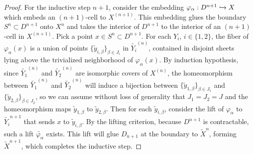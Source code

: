 \documentclass{article}
\begin{document}
\begin{enumerate}
\begin{enumerate}
\begin{proof}
        For the inductive step $n+1$, consider the embedding
        $\varphi_\alpha:D^{n+1}\xhookrightarrow{}X$ which embeds an
        $(n+1)$-cell to $X^{(n+1)}$. This embedding glues the boundary
        $S^n\subset D^{n+1}$ onto $X^n$ and takes the interior of $D^{n+1}$
        to the interior of an $(n+1)$-cell in $X^{(n+1)}$. Pick a point
        $x\in S^n\subset D^{n+1}$. For each $Y_i$, $i\in\{1,2\}$, the fiber
        of $\varphi_\alpha(x)$ is a union of points
        $\{\widetilde{y}_{i,\beta}\}_{\beta\in J_i}$ in
        $\widetilde{Y_i}^{(n)}$, contained in disjoint sheets lying above
        the trivialized neighborhood of $\varphi_\alpha(x)$. By induction
        hypothesis, since $\widetilde{Y_1}^{(n)}$ and
        $\widetilde{Y_2}^{(n)}$ are isomorphic covers of $X^{(n)}$, the
        homeomorphism between $\widetilde{Y_1}^{(n)}$ and
        $\widetilde{Y_2}^{(n)}$ will induce a bijection between
        $\{\widetilde{y}_{1,\beta}\}_{\beta\in J_1}$ and
        $\{\widetilde{y}_{2,\beta}\}_{\beta\in J_2}$, so we can assume
        without loss of generality that $J_1=J_2=J$ and the homeomorphism
        maps $\widetilde{y}_{1,\beta}$ to $\widetilde{y}_{2,\beta}$. Then
        for each $\widetilde{y}_{i,\beta}$, consider the lift of
        $\varphi_\alpha$ to $\widetilde{Y_i}^{n+1}$ that sends $x$ to
        $\widetilde{y}_{i,\beta}$. By the lifting criterion, because
        $D^{n+1}$ is contractable, such a lift
        $\widetilde{\varphi_\alpha}$ exists. This lift will glue
        $D_{n+1}$ at the boundary to $\widetilde{X}^n$, forming
        $\widetilde{X}^{n+1}$, which completes the inductive step.
      \end{proof}
    \end{enumerate}
\end{enumerate}
\end{document}
